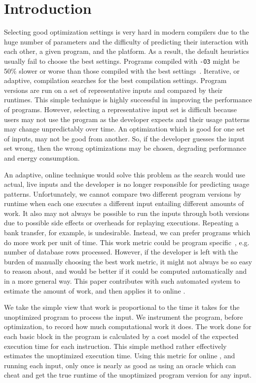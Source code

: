 \section{Introduction}

    Selecting good optimization settings is very hard in modern compilers due to the huge number of parameters and the difficulty
    of predicting their interaction with each other, a given program, and the platform. As a result, the default heuristics usually fail to
    choose the best settings. Programs compiled with \texttt{-O3} might be 50\% slower or worse than those compiled with the best
    settings~\cite{fursin07,chen12b}. Iterative, or adaptive, compilation searches for the best compilation settings. Program versions are run
    on a set of representative inputs and compared by their runtimes. This simple technique is highly successful in improving the
    performance of programs. However, selecting a representative input set is difficult because users may not use the program as the
    developer expects and their usage patterns may change unpredictably over time. An optimization which is good for one set of inputs, may
    not be good from another. So, if the developer guesses the input set wrong, then the wrong optimizations may be chosen, degrading
    performance and energy consumption.

    An adaptive, online technique would solve this problem as the search would use actual, live inputs and the developer is no longer
    responsible for predicting usage patterns. Unfortunately, we cannot compare two different program versions by runtime when each
    one executes a different input entailing different amounts of work.
    It also may not always be possible to run the inputs through both versions due to possible side effects or overheads for replaying
    executions.
    Repeating a bank transfer, for example, is undesirable. Instead, we can prefer programs which do more work per unit of time. This work
    metric could be program specific~\cite{alameldeen06,coppa14}, e.g. number of database rows processed.
    However, if the developer is left with the burden of manually choosing the best work metric, it might not always be so easy to reason
    about, and would be better if it could be computed automatically and in a more general way.
    This paper contributes with such automated system to estimate the amount of work, and then applies it to online {\itercomp}.

    We take the simple view that work is proportional to the time it takes for the unoptimized program to process the input. We
    instrument the program, before optimization, to record how much computational work it does. The work done for each basic block in the
    program is calculated by a cost model of the expected execution time for each instruction. This simple method rather effectively estimates
    the unoptimized execution time. Using this metric for online {\itercomp}, and running each input, only once is nearly as good as using an
    oracle which can cheat and get the true runtime of the unoptimized program version for any input.

